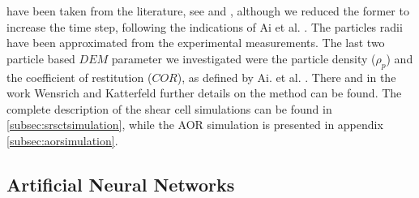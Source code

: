 have been taken from the literature, see \cite{RefWorks:175} and \cite{RefWorks:176}, 
although we reduced the former to increase the time step, following the indications of Ai et al. \cite{RefWorks:131}. 
The particles radii have been approximated from the experimental measurements. 
The last two particle based $DEM$ parameter we investigated were the particle density 
($\rho_p$) and the coefficient of restitution ($COR$), as defined by Ai. et al. \cite{RefWorks:131}. 
There and in the work Wensrich and Katterfeld \cite{RefWorks:87} further details on the method can be found.
The complete description of the shear cell simulations can be found in \ref{subsec:srsctsimulation}, 
while the AOR simulation is presented in appendix \ref{subsec:aorsimulation}.\\

\subsection{Artificial Neural Networks}
\label{subsec:ann}

